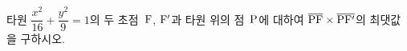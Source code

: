 타원 $\dfrac{x^2}{16}+\dfrac{y^2}{9}=1$의 두 초점~$\mathrm{F}$, $\mathrm{F}'$과 타원 위의 점~$\mathrm{P}$에 대하여 $\overline{\mathrm{PF}}\times\overline{\mathrm{PF'}}$의 최댓값을 구하시오.

